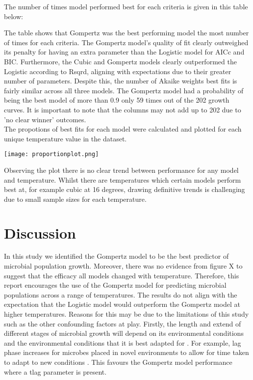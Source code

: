 \documentclass[11pt]{article}
\begin{document}
The number of times model performed best for each criteria is given in this table below: 
\begin{center}
\end{center}
The table shows that Gompertz was the best performing model the most number of times for each criteria. The Gompertz model's quality of fit clearly outweighed its penalty for having an extra parameter than the Logistic model for AICc and BIC. Furthermore, the Cubic and Gompertz models clearly outperformed the Logistic according to Rsqrd, aligning with expectations due to their greater number of parameters. Despite this, the number of Akaike weights best fits is fairly similar across all three models. The Gompertz model had a probability of being the best model of more than 0.9 only 59 times out of the 202 growth curves. It is important to note that the columns may not add up to 202 due to 'no clear winner' outcomes.\\

The propotions of best fits for each model were calculated and plotted for each unique temperature value in the dataset. 
  \begin{center}
    \texttt{[image: proportionplot.png]} 
  \end{center}
Observing the plot there is no clear trend between performance for any model and temperature. Whilst there are temperatures which certain models perform best at, for example cubic at 16 degrees, drawing definitive trends is challenging due to small sample sizes for each temperature.

\section{Discussion}

In this study we identified the Gompertz model to be the best predictor of microbial population growth. Moreover, there was no evidence from figure X to suggest that the efficacy all models changed with temperature. Therefore, this report encourages the use of the Gompertz model for predicting microbial populations across a range of temperatures. The results do not align with the expectation that the Logistic model would outperform the Gompertz model at higher temperatures. Reasons for this may be due to the limitations of this study such as the other confounding factors at play. Firstly, the length and extend of different stages of microbial growth will depend on its environmental conditions and the environmental conditions that it is best adapted for \cite{Dey2020}. For example, lag phase increases for microbes placed in novel environments to allow for time taken to adapt to new conditions \cite{Rolfe2012}. This favours the Gompertz model performance where a tlag parameter is present.\\
\end{document}
